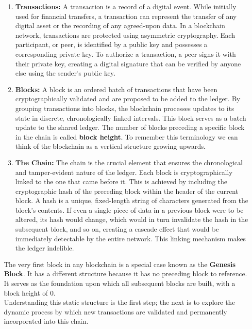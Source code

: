 \documentclass{scrbook}
\begin{document}
\begin{enumerate}
    \item \textbf{Transactions:} A transaction is a record of a digital event. While initially used for financial transfers, a transaction can represent the transfer of any digital asset or the recording of any agreed-upon data. In a blockchain network, transactions are protected using asymmetric cryptography. Each participant, or peer, is identified by a public key and possesses a corresponding private key. To authorize a transaction, a peer signs it with their private key, creating a digital signature that can be verified by anyone else using the sender's public key.
    
    \item \textbf{Blocks:} A block is an ordered batch of transactions that have been cryptographically validated and are proposed to be added to the ledger. By grouping transactions into blocks, the blockchain processes updates to its state in discrete, chronologically linked intervals. This block serves as a batch update to the shared ledger. The number of blocks preceding a specific block in the chain is called \textbf{block height}. To remember this terminology we can think of the blockchain as a vertical structure growing upwards.
    
    \item \textbf{The Chain:} The chain is the crucial element that ensures the chronological and tamper-evident nature of the ledger. Each block is cryptographically linked to the one that came before it. This is achieved by including the cryptographic hash of the preceding block within the header of the current block. A hash is a unique, fixed-length string of characters generated from the block's contents. If even a single piece of data in a previous block were to be altered, its hash would change, which would in turn invalidate the hash in the subsequent block, and so on, creating a cascade effect that would be immediately detectable by the entire network. This linking mechanism makes the ledger indelible.
\end{enumerate}

The very first block in any blockchain is a special case known as the \textbf{Genesis Block}. It has a different structure because it has no preceding block to reference. It serves as the foundation upon which all subsequent blocks are built, with a block height of 0. \\

Understanding this static structure is the first step; the next is to explore the dynamic process by which new transactions are validated and permanently incorporated into this chain.
\end{document}
